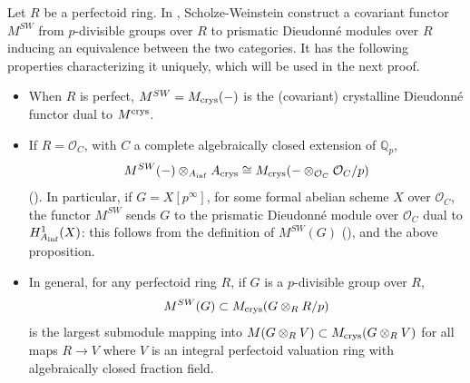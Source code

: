 \documentclass{amsart}
\theoremstyle{plain}
\theoremstyle{definition}
\newcommand{\blue}[1]{{\color{black}#1}}
\begin{document}
\blue{Let $R$ be a perfectoid ring. In \cite[Theorem 17.5.2]{scholze2020berkeley}, Scholze-Weinstein construct a covariant functor $M^{SW}$ from $p$-divisible groups over $R$ to prismatic Dieudonn\'e modules over $R$ inducing an equivalence between the two categories. It has the following properties characterizing it uniquely, which will be used in the next proof. \begin{itemize}
\item When $R$ is perfect, $M^{SW}=M_{\rm crys}(-)$ is the (covariant) crystalline Dieudonn\'e functor dual to $M^{\rm crys}$.
\item If $R=\mathcal{O}_C$, with $C$ a complete algebraically closed extension of $\mathbb{Q}_p$,
$$M^{SW}(-) \otimes_{A_{\rm inf}} A_{\rm crys} \cong M_{\rm crys}(- \otimes_{\mathcal{O}_C} \mathcal{O}_C/p)$$ (\cite[Proposition 14.8.3]{scholze2020berkeley}). In particular, if $G=X[p^{\infty}]$, for some formal abelian scheme $X$ over $\mathcal{O}_C$, the functor $M^{SW}$ sends $G$ to the prismatic Dieudonn\'e module over $\mathcal{O}_C$ dual to $H_{A_{\rm inf}}^1(X)$: this follows from the definition of $M^{SW}(G)$ (\cite[\S 12.1]{scholze2020berkeley}), \cite[Proposition 14.8.3]{scholze2020berkeley} and the above proposition.
\item In general, for any perfectoid ring $R$, if $G$ is a $p$-divisible group over $R$,
$$M^{SW}(G) \subset M_{\rm crys}(G \otimes_R R/p)$$
is the largest submodule mapping into $M(G \otimes_R V) \subset M_{\rm crys}(G \otimes_R V)$ for all maps $R \to V$ where $V$ is an integral perfectoid valuation ring with algebraically closed fraction field.
\end{itemize}  }
\end{document}
